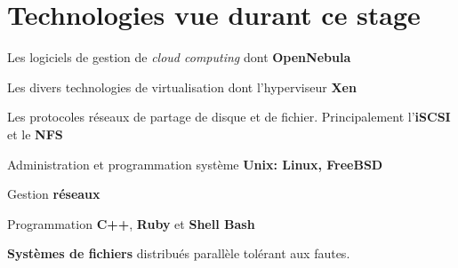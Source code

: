 \section*{Technologies vue durant ce stage}
\begin{listi}
	\item Les logiciels de gestion de \emph{cloud computing} dont \textbf{OpenNebula}\\
	\item Les divers technologies de virtualisation dont l'hyperviseur \textbf{Xen}\\
	\item Les protocoles réseaux de partage de disque et de fichier. Principalement l'\textbf{iSCSI} et le \textbf{NFS}\\
	\item Administration et programmation système \textbf{Unix: Linux, FreeBSD}\\
	\item Gestion \textbf{réseaux}\\
	\item Programmation \textbf{C++}, \textbf{Ruby} et \textbf{Shell Bash}\\
	\item \textbf{Systèmes de fichiers} distribués parallèle tolérant aux fautes.
\end{listi}

